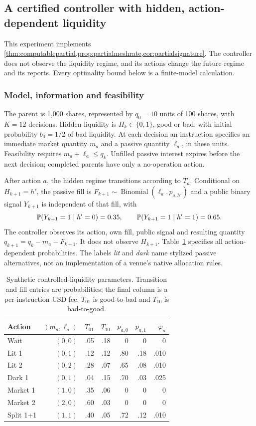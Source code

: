 \subsection{A certified controller with hidden, action-dependent liquidity}
\label{sec:partialexperiment}

This experiment implements \cref{thm:computablepartial,prop:partialmeshrate,cor:partialsignature}.
The controller does not observe the liquidity regime,
and its actions change the future regime and its reports. Every optimality
bound below is a finite-model calculation. 

\subsubsection*{Model, information and feasibility}

The parent is 1,000 shares, represented by $q_0=10$ units of 100 shares,
with $K=12$ decisions. Hidden liquidity is $H_k\in\{0,1\}$, good or bad,
with initial probability $b_0=1/2$ of bad liquidity. At each decision an
instruction specifies an immediate market quantity $m_a$ and a passive
quantity $\ell_a$, in these units. Feasibility requires
$m_a+\ell_a\le q_k$. Unfilled passive interest expires before the next
decision; completed parents have only a no-operation action.

After action $a$, the hidden regime transitions according to $T_a$.
Conditional on $H_{k+1}=h'$, the passive fill is
$F_{k+1}\sim\operatorname{Binomial}(\ell_a,p_{a,h'})$ and a public binary
signal $Y_{k+1}$ is independent of that fill, with
\[
 \mathbb P(Y_{k+1}=1\mid h'=0)=0.35,\qquad
 \mathbb P(Y_{k+1}=1\mid h'=1)=0.65.
\]
The controller observes its action, own fill, public signal and resulting
quantity $q_{k+1}=q_k-m_a-F_{k+1}$. It does not observe $H_{k+1}$.
Table~\ref{tab:partialparameters} specifies all action-dependent probabilities.
The labels \emph{lit} and \emph{dark} name stylized passive alternatives, not an
implementation of a venue's native allocation rules.

\begin{table}[tb]
\centering\small
\caption{Synthetic controlled-liquidity parameters. Transition and fill
entries are probabilities; the final column is a per-instruction USD fee.
$T_{01}$ is good-to-bad and $T_{10}$ is bad-to-good.}
\label{tab:partialparameters}
\begin{tabular}{lrrrrrr}
\toprule
Action & $(m_a,\ell_a)$ & $T_{01}$ & $T_{10}$ & $p_{a,0}$ & $p_{a,1}$ & $\varphi_a$\\
\midrule
Wait & $(0,0)$ & .05 & .18 & 0 & 0 & 0\\
Lit 1 & $(0,1)$ & .12 & .12 & .80 & .18 & .010\\
Lit 2 & $(0,2)$ & .28 & .07 & .65 & .08 & .010\\
Dark 1 & $(0,1)$ & .04 & .15 & .70 & .03 & .025\\
Market 1 & $(1,0)$ & .35 & .06 & 0 & 0 & 0\\
Market 2 & $(2,0)$ & .60 & .03 & 0 & 0 & 0\\
Split 1+1 & $(1,1)$ & .40 & .05 & .72 & .12 & .010\\
\bottomrule
\end{tabular}
\end{table}

